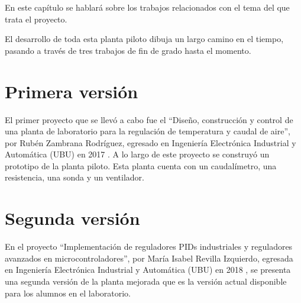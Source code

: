 
En este capítulo se hablará sobre los trabajos relacionados con el tema del que trata el proyecto.

El desarrollo de toda esta planta piloto dibuja un largo camino en el tiempo, pasando a través de tres trabajos de fin de grado hasta el momento.

\section{Primera versión}

El primer proyecto que se llevó a cabo fue el ``Diseño, construcción y control de una planta de laboratorio para la regulación de temperatura y caudal de aire'', por Rubén Zambrana Rodríguez, egresado en Ingeniería Electrónica Industrial y Automática (UBU) en 2017 \cite{06tfgRuben}. A lo largo de este proyecto se construyó un prototipo de la planta piloto. Esta planta cuenta con un caudalímetro, una resistencia, una sonda y un ventilador.

\section{Segunda versión}

En el proyecto ``Implementación de reguladores PIDs industriales y reguladores avanzados en microcontroladores'', por María Isabel Revilla Izquierdo, egresada en Ingeniería Electrónica Industrial y Automática (UBU) en 2018 \cite{07tfgMaria}, se presenta una segunda versión de la planta mejorada que es la versión actual disponible para los alumnos en el laboratorio.